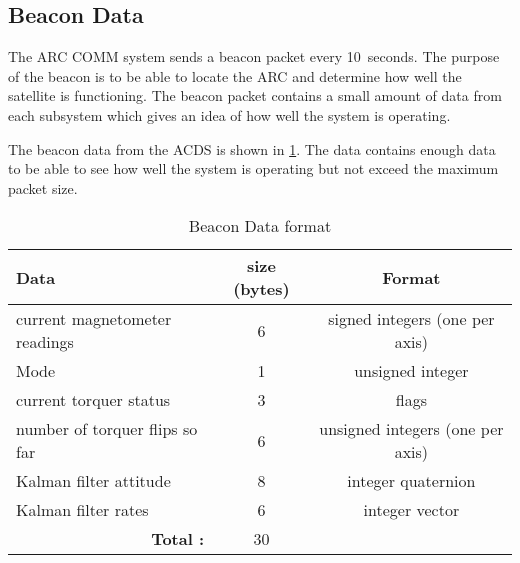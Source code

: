 \subsection{Beacon Data}

The \ac{ARC} \ac{COMM} system sends a beacon packet every 10~seconds. The purpose of the beacon is to be able to locate the \ac{ARC} and determine how well the satellite is functioning. The beacon packet contains a small amount of data from each subsystem which gives an idea of how well the system is operating.

The beacon data from the \ac{ACDS} is shown in \cref{tab:beacondat}. The data contains enough data to be able to see how well the system is operating but not exceed the maximum packet size.

\begin{table}[H]
    \centering
    \caption{Beacon Data format}
    \label{tab:beacondat}
    \begin{tabular}{|l|c|c|}
        \hline
        Data&size (bytes)&Format\\
        \hline
        current magnetometer readings&6&signed integers (one per axis)\\
        \hline
        Mode&1&unsigned integer\\
        \hline
        current torquer status&3&flags\\
        \hline
        number of torquer flips so far & 6 & unsigned integers (one per axis)\\
        \hline
        Kalman filter attitude&8&integer quaternion\\
        \hline
        Kalman filter rates&6&integer vector\\
        \hline
        \multicolumn{1}{|r|}{\bfseries Total :}&30&\\
        \hline
    \end{tabular}
\end{table}

